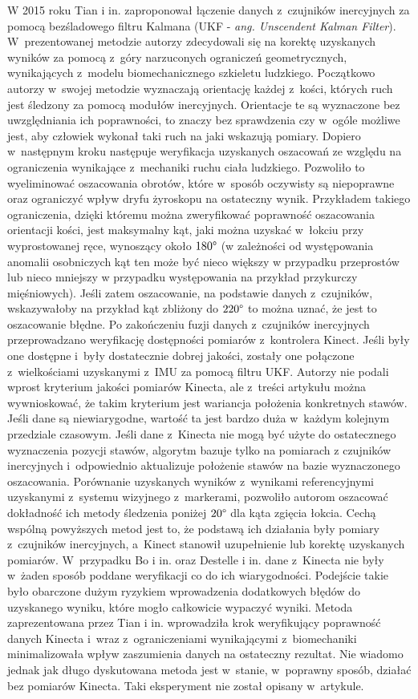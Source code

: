 W 2015 roku Tian i in. \cite{Tian2015a} zaproponował łączenie danych z~czujników inercyjnych za pomocą bezśladowego filtru Kalmana (UKF - \emph{ang. Unscendent Kalman Filter}). W~prezentowanej metodzie autorzy zdecydowali się na korektę uzyskanych wyników za pomocą z~góry narzuconych ograniczeń geometrycznych, wynikających z~modelu biomechanicznego szkieletu ludzkiego. Początkowo autorzy w~swojej metodzie wyznaczają orientację każdej z~kości, których ruch jest śledzony za pomocą modułów inercyjnych. Orientacje te są wyznaczone bez uwzględniania ich poprawności, to znaczy bez sprawdzenia czy w~ogóle możliwe jest, aby człowiek wykonał taki ruch na jaki wskazują pomiary. Dopiero w~następnym kroku następuje weryfikacja uzyskanych oszacowań ze względu na ograniczenia wynikające z~mechaniki ruchu ciała ludzkiego. Pozwoliło to wyeliminować oszacowania obrotów, które w~sposób oczywisty są niepoprawne oraz ograniczyć wpływ dryfu żyroskopu na ostateczny wynik. Przykładem takiego ograniczenia, dzięki któremu można zweryfikować poprawność oszacowania orientacji kości, jest maksymalny kąt, jaki można uzyskać w~łokciu przy wyprostowanej ręce, wynoszący około $180\degree$ (w zależności od występowania anomalii osobniczych kąt ten może być nieco większy w przypadku przeprostów lub nieco mniejszy w przypadku występowania na przykład przykurczy mięśniowych). Jeśli zatem oszacowanie, na podstawie danych z~czujników, wskazywałoby na przykład kąt zbliżony do $220\degree$ to można uznać, że jest to oszacowanie błędne. Po zakończeniu fuzji danych z~czujników inercyjnych przeprowadzano weryfikację dostępności pomiarów z~kontrolera Kinect. Jeśli były one dostępne i~były dostatecznie dobrej jakości, zostały one połączone z~wielkościami uzyskanymi z~IMU za pomocą filtru UKF. Autorzy nie podali wprost kryterium jakości pomiarów Kinecta, ale z~treści artykułu można wywnioskować, że takim kryterium jest wariancja położenia konkretnych stawów. Jeśli dane są niewiarygodne, wartość ta jest bardzo duża w~każdym kolejnym przedziale czasowym. Jeśli dane z~Kinecta nie mogą być użyte do ostatecznego wyznaczenia pozycji stawów, algorytm bazuje tylko na pomiarach z czujników inercyjnych i~odpowiednio aktualizuje położenie stawów na bazie wyznaczonego oszacowania. Porównanie uzyskanych wyników z~wynikami referencyjnymi uzyskanymi z~systemu wizyjnego z~markerami, pozwoliło autorom oszacować dokładność ich metody śledzenia poniżej $20\degree$ dla kąta zgięcia łokcia.																																																	
Cechą wspólną powyższych metod jest to, że podstawą ich działania były pomiary z~czujników inercyjnych, a~Kinect stanowił uzupełnienie lub korektę uzyskanych pomiarów. W~przypadku Bo i in. oraz Destelle i in. dane z~Kinecta nie były w~żaden sposób poddane weryfikacji co do ich wiarygodności. Podejście takie było obarczone dużym ryzykiem wprowadzenia dodatkowych błędów do uzyskanego wyniku, które mogło całkowicie wypaczyć wyniki. Metoda zaprezentowana przez Tian i in. wprowadziła krok weryfikujący poprawność danych Kinecta i~wraz z~ograniczeniami wynikającymi z~biomechaniki minimalizowała wpływ zaszumienia danych na ostateczny rezultat. Nie wiadomo jednak jak długo dyskutowana metoda jest w~stanie, w~poprawny sposób, działać bez pomiarów Kinecta. Taki eksperyment nie został opisany w~artykule.																																																	
